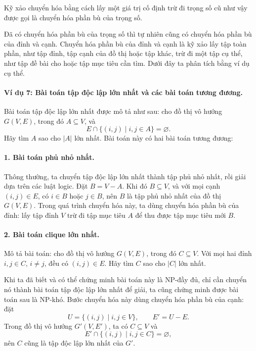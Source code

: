 \documentclass[11pt]{article}
\begin{document}
Kỹ xảo chuyển hóa bằng cách lấy một giá trị cố định trừ đi trọng số cũ như
vậy được gọi là chuyển hóa phần bù của trọng số.

Đã có chuyển hóa phần bù của trọng số thì tự nhiên cũng có chuyển hóa phần bù
của đỉnh và cạnh. Chuyển hóa phần bù của đỉnh và cạnh là kỹ xảo lấy tập toàn
phần, như tập đỉnh, tập cạnh của đồ thị hoặc tập khác, trừ đi một tập cụ thể,
như tập đề bài cho hoặc tập mục tiêu cần tìm. Dưới đây ta phân tích bằng ví
dụ cụ thể.

\paragraph{Ví dụ 7: Bài toán tập độc lập lớn nhất và các bài toán tương đương.}
Bài toán tập độc lập lớn nhất được mô tả như sau: cho đồ thị vô hướng
\(G(V,E)\), trong đó \(A\subseteq V\), và
\[
  E\cap \{(i,j)\mid i,j\in A\}=\varnothing.
\]
Hãy tìm \(A\) sao cho \(|A|\) lớn nhất. Bài toán này có hai bài toán tương
đương:

\paragraph{1. Bài toán phủ nhỏ nhất.}
Thông thường, ta chuyển tập độc lập lớn nhất thành tập phủ nhỏ nhất, rồi giải
dựa trên các luật logic. Đặt \(B=V-A\). Khi đó \(B\subseteq V\), và với mọi
cạnh \((i,j)\in E\), có \(i\in B\) hoặc \(j\in B\), nên \(B\) là tập phủ nhỏ
nhất của đồ thị \(G(V,E)\). Trong quá trình chuyển hóa này, ta dùng chuyển
hóa phần bù của đỉnh: lấy tập đỉnh \(V\) trừ đi tập mục tiêu \(A\) để thu
được tập mục tiêu mới \(B\).

\paragraph{2. Bài toán clique lớn nhất.}
Mô tả bài toán: cho đồ thị vô hướng \(G(V,E)\), trong đó \(C\subseteq V\).
Với mọi hai đỉnh \(i,j\in C\), \(i\ne j\), đều có \((i,j)\in E\). Hãy tìm
\(C\) sao cho \(|C|\) lớn nhất.

Khi ta đã biết và có thể chứng minh bài toán này là NP-đầy đủ, chỉ cần chuyển
nó thành bài toán tập độc lập lớn nhất để giải, ta cũng chứng minh được bài
toán sau là NP-khó. Bước chuyển hóa này dùng chuyển hóa phần bù của cạnh:
đặt
\[
  U=\{(i,j)\mid i,j\in V\},\qquad E'=U-E.
\]
Trong đồ thị vô hướng \(G'(V,E')\), ta có \(C\subseteq V\) và
\[
  E'\cap\{(i,j)\mid i,j\in C\}=\varnothing,
\]
nên \(C\) cũng là tập độc lập lớn nhất của \(G'\).
\end{document}
